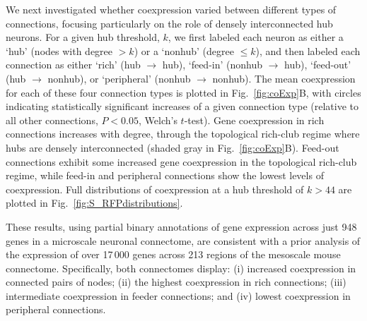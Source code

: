\documentclass[10pt,letterpaper]{article}
\begin{document}

We next investigated whether coexpression varied between different types of connections, focusing particularly on the role of densely interconnected hub neurons.
For a given hub threshold, $k$, we first labeled each neuron as either a `hub' (nodes with degree $> k$) or a `nonhub' (degree $\leq k$), and then labeled each connection as either `rich' (hub $\rightarrow$ hub), `feed-in' (nonhub $\rightarrow$ hub), `feed-out' (hub $\rightarrow$ nonhub), or `peripheral' (nonhub $\rightarrow$ nonhub).
The mean coexpression for each of these four connection types is plotted in Fig.~\ref{fig:coExp}B, with circles indicating statistically significant increases of a given connection type (relative to all other connections, $P < 0.05$, Welch's $t$-test).
Gene coexpression in rich connections increases with degree, through the topological rich-club regime where hubs are densely interconnected (shaded gray in Fig.~\ref{fig:coExp}B).
Feed-out connections exhibit some increased gene coexpression in the topological rich-club regime, while feed-in and peripheral connections show the lowest levels of coexpression.
Full distributions of coexpression at a hub threshold of $k > 44$ are plotted in Fig.~\ref{fig:S_RFPdistributions}.

These results, using partial binary annotations of gene expression across just 948 genes in a microscale neuronal connectome, are consistent with a prior analysis of the expression of over 17\,000 genes across 213 regions of the mesoscale mouse connectome.
Specifically, both connectomes display:
(i) increased coexpression in connected pairs of nodes;
(ii) the highest coexpression in rich connections;
(iii) intermediate coexpression in feeder connections; and
(iv) lowest coexpression in peripheral connections.
\end{document}
